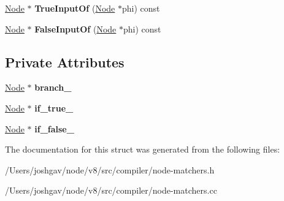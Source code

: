 \begin{DoxyCompactItemize}
\item 
\hyperlink{classv8_1_1internal_1_1compiler_1_1_node}{Node} $\ast$ {\bfseries True\+Input\+Of} (\hyperlink{classv8_1_1internal_1_1compiler_1_1_node}{Node} $\ast$phi) const \hypertarget{structv8_1_1internal_1_1compiler_1_1_diamond_matcher_a16247cf88698eb6702987b00318f91fd}{}\label{structv8_1_1internal_1_1compiler_1_1_diamond_matcher_a16247cf88698eb6702987b00318f91fd}

\item 
\hyperlink{classv8_1_1internal_1_1compiler_1_1_node}{Node} $\ast$ {\bfseries False\+Input\+Of} (\hyperlink{classv8_1_1internal_1_1compiler_1_1_node}{Node} $\ast$phi) const \hypertarget{structv8_1_1internal_1_1compiler_1_1_diamond_matcher_a48dbe2afe54646d71358f08708f2424b}{}\label{structv8_1_1internal_1_1compiler_1_1_diamond_matcher_a48dbe2afe54646d71358f08708f2424b}

\end{DoxyCompactItemize}
\subsection*{Private Attributes}
\begin{DoxyCompactItemize}
\item 
\hyperlink{classv8_1_1internal_1_1compiler_1_1_node}{Node} $\ast$ {\bfseries branch\+\_\+}\hypertarget{structv8_1_1internal_1_1compiler_1_1_diamond_matcher_af226bd4394eb375ca458cd5625013775}{}\label{structv8_1_1internal_1_1compiler_1_1_diamond_matcher_af226bd4394eb375ca458cd5625013775}

\item 
\hyperlink{classv8_1_1internal_1_1compiler_1_1_node}{Node} $\ast$ {\bfseries if\+\_\+true\+\_\+}\hypertarget{structv8_1_1internal_1_1compiler_1_1_diamond_matcher_a3dbc27e8e9c9e30bb363e9317591503f}{}\label{structv8_1_1internal_1_1compiler_1_1_diamond_matcher_a3dbc27e8e9c9e30bb363e9317591503f}

\item 
\hyperlink{classv8_1_1internal_1_1compiler_1_1_node}{Node} $\ast$ {\bfseries if\+\_\+false\+\_\+}\hypertarget{structv8_1_1internal_1_1compiler_1_1_diamond_matcher_a1b50f5ced2257f8efa16e30122a9cd81}{}\label{structv8_1_1internal_1_1compiler_1_1_diamond_matcher_a1b50f5ced2257f8efa16e30122a9cd81}

\end{DoxyCompactItemize}


The documentation for this struct was generated from the following files\+:\begin{DoxyCompactItemize}
\item 
/\+Users/joshgav/node/v8/src/compiler/node-\/matchers.\+h\item 
/\+Users/joshgav/node/v8/src/compiler/node-\/matchers.\+cc\end{DoxyCompactItemize}
